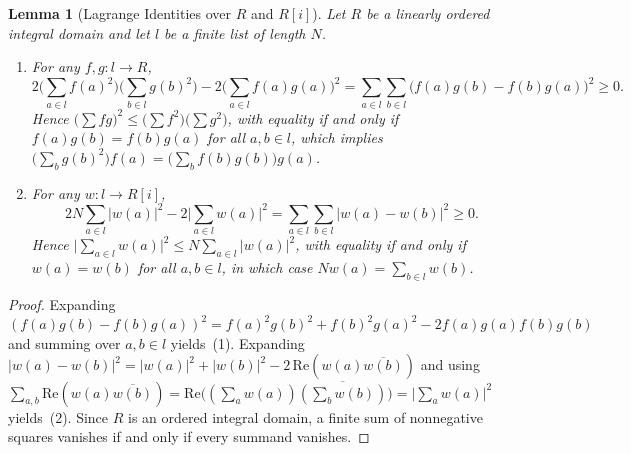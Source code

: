 \documentclass[11pt]{article}
\newtheorem{lemma}[theorem]{Lemma}
\theoremstyle{definition}
\begin{document}
\begin{lemma}[Lagrange Identities over $R$ and {$R[i]$}]\label{lem:lagrange}
Let $R$ be a linearly ordered integral domain and let $l$ be a finite list of length $N$.
\begin{enumerate}
  \item For any $f, g : l \to R$,
  \[
    2 \biggl(\sum_{a \in l} f(a)^2\biggr)\biggl(\sum_{b \in l} g(b)^2\biggr)
    - 2 \biggl(\sum_{a \in l} f(a) g(a)\biggr)^2
    = \sum_{a \in l} \sum_{b \in l} \bigl(f(a) g(b) - f(b) g(a)\bigr)^2 \ge 0.
  \]
  Hence $\bigl(\sum f g\bigr)^2 \le \bigl(\sum f^2\bigr)\bigl(\sum g^2\bigr)$, with equality
  if and only if $f(a) g(b) = f(b) g(a)$ for all $a, b \in l$, which implies
  $\bigl(\sum_b g(b)^2\bigr) f(a) = \bigl(\sum_b f(b) g(b)\bigr) g(a)$.
  \item For any $w : l \to R[i]$,
  \[
    2 N \sum_{a \in l} |w(a)|^2 - 2 \biggl|\sum_{a \in l} w(a)\biggr|^2
    = \sum_{a \in l} \sum_{b \in l} |w(a) - w(b)|^2 \ge 0.
  \]
  Hence $\bigl|\sum_{a \in l} w(a)\bigr|^2 \le N \sum_{a \in l} |w(a)|^2$, with equality if
  and only if $w(a) = w(b)$ for all $a, b \in l$, in which case $N w(a) = \sum_{b \in l} w(b)$.
\end{enumerate}
\end{lemma}

\begin{proof}
Expanding $(f(a)g(b) - f(b)g(a))^2 = f(a)^2 g(b)^2 + f(b)^2 g(a)^2 - 2 f(a)g(a)f(b)g(b)$ and
summing over $a, b \in l$ yields~(1). Expanding $|w(a) - w(b)|^2 = |w(a)|^2 + |w(b)|^2 -
2\,\mathrm{Re}(w(a)\overline{w(b)})$ and using $\sum_{a,b} \mathrm{Re}(w(a)\overline{w(b)}) =
\mathrm{Re}\bigl((\sum_a w(a))\overline{(\sum_b w(b))}\bigr) = \bigl|\sum_a w(a)\bigr|^2$
yields~(2). Since $R$ is an ordered integral domain, a finite sum of nonnegative squares
vanishes if and only if every summand vanishes.
\end{proof}
\end{document}
